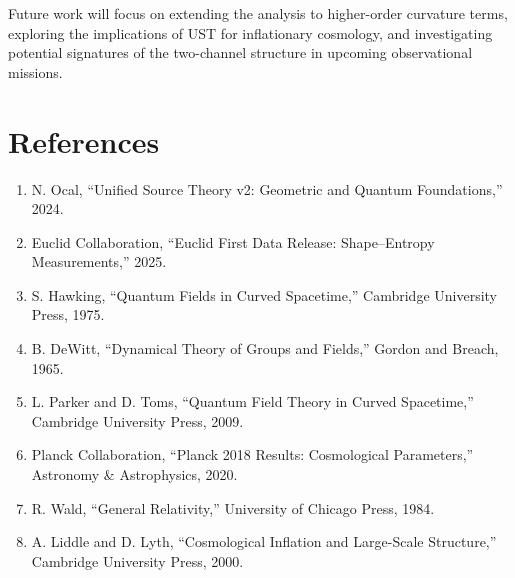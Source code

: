 \documentclass[12pt]{article}
\begin{document}
Future work will focus on extending the analysis to higher-order curvature
terms, exploring the implications of UST for inflationary cosmology, and
investigating potential signatures of the two-channel structure in upcoming
observational missions.

\section*{References}

\begin{enumerate}
\item N. Ocal, ``Unified Source Theory v2: Geometric and Quantum Foundations,''
2024.

\item Euclid Collaboration, ``Euclid First Data Release: Shape--Entropy
Measurements,'' 2025.

\item S. Hawking, ``Quantum Fields in Curved Spacetime,'' Cambridge University
Press, 1975.

\item B. DeWitt, ``Dynamical Theory of Groups and Fields,'' Gordon and Breach,
1965.

\item L. Parker and D. Toms, ``Quantum Field Theory in Curved Spacetime,''
Cambridge University Press, 2009.

\item Planck Collaboration, ``Planck 2018 Results: Cosmological Parameters,''
Astronomy \& Astrophysics, 2020.

\item R. Wald, ``General Relativity,'' University of Chicago Press, 1984.

\item A. Liddle and D. Lyth, ``Cosmological Inflation and Large-Scale
Structure,'' Cambridge University Press, 2000.
\end{enumerate}
\end{document}

